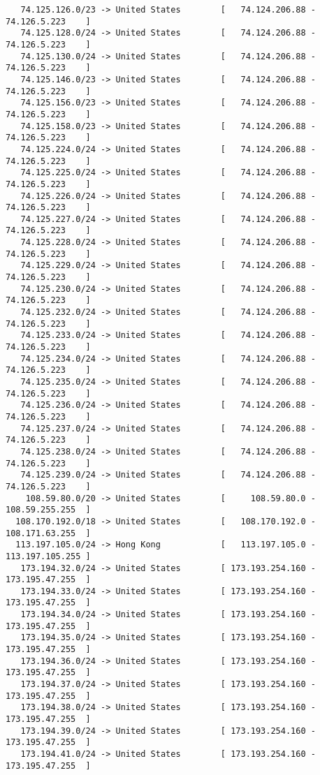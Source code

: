 \documentclass[10pt,a4paper,twoside,onecolumn]{article}
\begin{document}
\begin{lstlisting}
   74.125.126.0/23 -> United States        [   74.124.206.88 - 74.126.5.223    ]
   74.125.128.0/24 -> United States        [   74.124.206.88 - 74.126.5.223    ]
   74.125.130.0/24 -> United States        [   74.124.206.88 - 74.126.5.223    ]
   74.125.146.0/23 -> United States        [   74.124.206.88 - 74.126.5.223    ]
   74.125.156.0/23 -> United States        [   74.124.206.88 - 74.126.5.223    ]
   74.125.158.0/23 -> United States        [   74.124.206.88 - 74.126.5.223    ]
   74.125.224.0/24 -> United States        [   74.124.206.88 - 74.126.5.223    ]
   74.125.225.0/24 -> United States        [   74.124.206.88 - 74.126.5.223    ]
   74.125.226.0/24 -> United States        [   74.124.206.88 - 74.126.5.223    ]
   74.125.227.0/24 -> United States        [   74.124.206.88 - 74.126.5.223    ]
   74.125.228.0/24 -> United States        [   74.124.206.88 - 74.126.5.223    ]
   74.125.229.0/24 -> United States        [   74.124.206.88 - 74.126.5.223    ]
   74.125.230.0/24 -> United States        [   74.124.206.88 - 74.126.5.223    ]
   74.125.232.0/24 -> United States        [   74.124.206.88 - 74.126.5.223    ]
   74.125.233.0/24 -> United States        [   74.124.206.88 - 74.126.5.223    ]
   74.125.234.0/24 -> United States        [   74.124.206.88 - 74.126.5.223    ]
   74.125.235.0/24 -> United States        [   74.124.206.88 - 74.126.5.223    ]
   74.125.236.0/24 -> United States        [   74.124.206.88 - 74.126.5.223    ]
   74.125.237.0/24 -> United States        [   74.124.206.88 - 74.126.5.223    ]
   74.125.238.0/24 -> United States        [   74.124.206.88 - 74.126.5.223    ]
   74.125.239.0/24 -> United States        [   74.124.206.88 - 74.126.5.223    ]
    108.59.80.0/20 -> United States        [     108.59.80.0 - 108.59.255.255  ]
  108.170.192.0/18 -> United States        [   108.170.192.0 - 108.171.63.255  ]
  113.197.105.0/24 -> Hong Kong            [   113.197.105.0 - 113.197.105.255 ]
   173.194.32.0/24 -> United States        [ 173.193.254.160 - 173.195.47.255  ]
   173.194.33.0/24 -> United States        [ 173.193.254.160 - 173.195.47.255  ]
   173.194.34.0/24 -> United States        [ 173.193.254.160 - 173.195.47.255  ]
   173.194.35.0/24 -> United States        [ 173.193.254.160 - 173.195.47.255  ]
   173.194.36.0/24 -> United States        [ 173.193.254.160 - 173.195.47.255  ]
   173.194.37.0/24 -> United States        [ 173.193.254.160 - 173.195.47.255  ]
   173.194.38.0/24 -> United States        [ 173.193.254.160 - 173.195.47.255  ]
   173.194.39.0/24 -> United States        [ 173.193.254.160 - 173.195.47.255  ]
   173.194.41.0/24 -> United States        [ 173.193.254.160 - 173.195.47.255  ]

\end{lstlisting}
\end{document}
